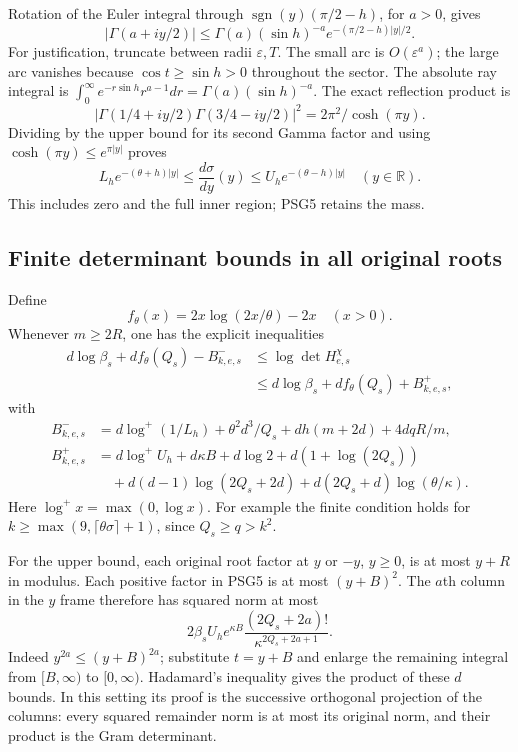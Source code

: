 \documentclass[10pt]{article}
\begin{document}
Rotation of the Euler integral through
\(\operatorname{sgn}(y)(\pi/2-h)\), for \(a>0\), gives
\[
 |\Gamma(a+iy/2)|\le
 \Gamma(a)(\sin h)^{-a}e^{-(\pi/2-h)|y|/2}.
\]
For justification, truncate between radii \(\varepsilon,T\).
The small arc is \(O(\varepsilon^a)\); the large arc vanishes because
\(\cos t\ge\sin h>0\) throughout the sector. The absolute ray integral
is \(\int_0^\infty e^{-r\sin h}r^{a-1}dr=\Gamma(a)(\sin h)^{-a}\).
The exact reflection product is
\[
 |\Gamma(1/4+iy/2)\Gamma(3/4-iy/2)|^2
       =2\pi^2/\cosh(\pi y).
\]
Dividing by the upper bound for its second Gamma factor and using
\(\cosh(\pi y)\le e^{\pi|y|}\) proves
\[
 L_h e^{-(\theta+h)|y|}\le \frac{d\sigma}{dy}(y)
                   \le U_h e^{-(\theta-h)|y|}\quad(y\in\mathbb R).
 \tag{PSG6}
\]
This includes zero and the full inner region; PSG5 retains the mass.

\subsection{Finite determinant bounds in all original roots}
Define
\[
 f_\theta(x)=2x\log(2x/\theta)-2x\quad(x>0).
 \tag{PSG7}
\]
Whenever \(m\ge2R\), one has the explicit inequalities
\[
\begin{split}
 d\log\beta_s+d f_\theta(Q_s)-B^-_{k,e,s}
 &\le\log\det H^\chi_{e,s}\\
 &\le d\log\beta_s+d f_\theta(Q_s)+B^+_{k,e,s},
\end{split}\tag{PSG8}
\]
with
\[
\begin{split}
 B^-_{k,e,s}
 &=d\log^+(1/L_h)+\theta^2d^3/Q_s
           +dh(m+2d)+4dqR/m,\\
 B^+_{k,e,s}
 &=d\log^+U_h+d\kappa B+d\log2+d(1+\log(2Q_s))\\
 &\quad+d(d-1)\log(2Q_s+2d)
           +d(2Q_s+d)\log(\theta/\kappa).
\end{split}\tag{PSG9}
\]
Here \(\log^+x=\max(0,\log x)\). For example the finite condition holds
for \(k\ge\max(9,\lceil\theta\sigma\rceil+1)\), since \(Q_s\ge q>k^2\).

For the upper bound, each original root factor at \(y\) or \(-y\),
\(y\ge0\), is at most \(y+R\) in modulus. Each positive factor in
PSG5 is at most \((y+B)^2\). The \(a\)th column in the \(y\) frame
therefore has squared norm at most
\[
 2\beta_s U_h e^{\kappa B}
           \frac{(2Q_s+2a)!}{\kappa^{2Q_s+2a+1}}.
 \tag{PSG10}
\]
Indeed \(y^{2a}\le(y+B)^{2a}\); substitute \(t=y+B\) and enlarge
the remaining integral from \([B,\infty)\) to \([0,\infty)\).
Hadamard's inequality gives the product of these \(d\) bounds.
In this setting its proof is the successive orthogonal projection
of the columns: every squared remainder norm is at most its
original norm, and their product is the Gram determinant.
\end{document}
